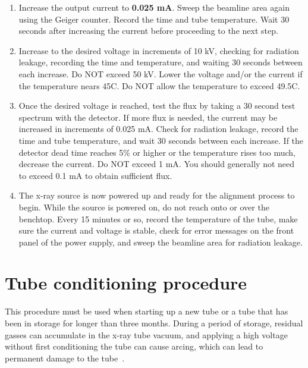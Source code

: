 \begin{enumerate}
\item Increase the output current to \textbf{0.025 mA}. Sweep the beamline area again using the Geiger counter.  Record the time and tube temperature. Wait 30 seconds after increasing the current before proceeding to the next step.

\item Increase to the desired voltage in increments of 10 kV, checking for radiation leakage, recording the time and temperature, and waiting 30 seconds between each increase. Do NOT exceed 50 kV.  Lower the voltage and/or the current if the temperature nears 45C. Do NOT allow the temperature to exceed 49.5C.

\item Once the desired voltage is reached, test the flux by taking a 30 second test spectrum with the detector. If more flux is needed, the current may be increased in increments of 0.025 mA. Check for radiation leakage, record the time and tube temperature, and wait 30 seconds between each increase.  If the detector dead time reaches 5\% or higher or the temperature rises too much, decrease the current. Do NOT exceed 1 mA.  You should generally not need to exceed 0.1 mA to obtain sufficient flux.\label{item:finish}

\item The x-ray source is now powered up and ready for the alignment process to begin. While the source is powered on, do not reach onto or over the benchtop. Every 15 minutes or so, record the temperature of the tube, make sure the current and voltage is stable, check for error messages on the front panel of the power supply, and sweep the beamline area for radiation leakage.

\end{enumerate}

\section{Tube conditioning procedure\label{sec:conditioning}}

This procedure must be used when starting up a new tube or a tube that has been in storage for longer than three months. During a period of storage, residual gasses can accumulate in the x-ray tube vacuum, and applying a high voltage without first conditioning the tube can cause arcing, which can lead to permanent damage to the tube~\cite{tube_conditioning}.

